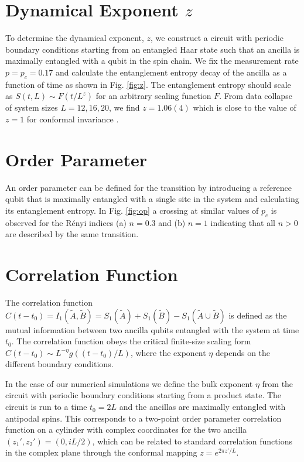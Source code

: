 \documentclass[prl,twocolumn,aps,showpacs,amsmath,amssymb,superscriptaddress,floatfix,longbibliography]{revtex4-1}
\begin{document}
\section{Dynamical Exponent $z$}
To determine the dynamical exponent, $z$, we construct a circuit with periodic boundary conditions starting from an entangled Haar state such that an ancilla is maximally entangled with a qubit in the spin chain. We fix the measurement rate $p = p_c = 0.17$ and calculate the entanglement entropy decay of the ancilla as a function of time as shown in Fig. \ref{fig:z}. The entanglement entropy should scale as $S(t,L)\sim F(t/L^z)$ for an arbitrary scaling function $F$. From data collapse of system sizes $L = 12,16,20$, we find $z = 1.06(4)$ which is close to the value of $z=1$ for conformal invariance \cite{Ludwig2019,LCF2019}.




\section{Order Parameter}
An order parameter can be defined for the transition by introducing a reference qubit that is maximally entangled with a single site in the system and calculating its entanglement entropy. In Fig. \ref{fig:op} a crossing at similar values  of $p_c$ is observed for the R\'enyi indices (a) $n = 0.3$ and (b) $n = 1$ indicating that all $n>0$ are described by the same transition.


\section{Correlation Function}
The correlation function $C(t-t_0) = I_1(\tilde A,\tilde B) = S_1(\tilde A) + S_1(\tilde B)- S_1(\tilde A\cup \tilde B)$ is defined as the mutual information between two ancilla qubits entangled with the system at time $t_0$. The correlation function obeys the critical finite-size scaling form $C(t-t_0)\sim L^{-\eta}g((t-t_0)/L)$, where the exponent $\eta$ depends on the different boundary conditions. 

In the case of our numerical simulations we define the bulk exponent $\eta$ from the circuit with periodic boundary conditions starting from a product state. The circuit is run to a time $t_0 = 2L$ and the ancillas are maximally entangled with antipodal spins.  This corresponds to a two-point order parameter correlation function on a cylinder with complex coordinates for the two ancilla $(z_1',z_2')=(0,iL/2)$, which can be related to standard correlation functions in the complex plane through the conformal mapping $z = e^{2 \pi z'/L}$.  
\end{document}

